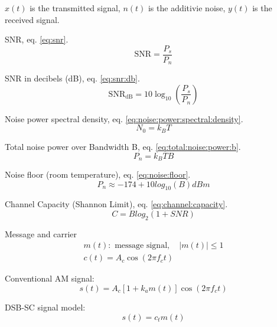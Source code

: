 $x(t)$ is the transmitted signal, $n(t)$ is the additivie noise, $y(t)$ is the received signal.

SNR, eq. \ref{eq:snr}.
\begin{equation}
  \label{eq:snr}
  \text{SNR} = \frac{P_s}{P_n}
\end{equation}

SNR in decibels (dB), eq. \ref{eq:snr:db}.
\begin{equation}
  \label{eq:snr:db}
  \text{SNR}_{\text{dB}} = 10 \log_{10}\left( \frac{P_s}{P_n} \right)
\end{equation}

Noise power spectral density, eq. \ref{eq:noise:power:spectral:density}.
\begin{equation}
  \label{eq:noise:power:spectral:density}
  N_0 = k_B T
\end{equation}

Total noise power over Bandwidth B, eq. \ref{eq:total:noise:power:b}.
\begin{equation}
  \label{eq:total:noise:power:b}
  P_n = k_B TB
\end{equation}

Noise floor (room temperature), eq. \ref{eq:noise:floor}.
\begin{equation}
  \label{eq:noise:floor}
  P_n \approx -174 + 10log_{10}(B) dBm
\end{equation}

Channel Capacity (Shannon Limit), eq. \ref{eq:channel:capacity}.
\begin{equation}
  \label{eq:channel:capacity}
  C = B log_2(1 + SNR)
\end{equation}

Message and carrier
\begin{equation}
  \label{eq:message}
  \begin{split}
  m(t): \text{ message signal}, \quad |m(t)| \leq 1\\
  c(t) = A_c \cos(2\pi f_c t)
  \end{split}
\end{equation}

Conventional AM signal:
\begin{equation}
  \label{eq:conv:am:signal}
  s(t) = A_c \left[1 + k_a m(t)\right] \cos(2\pi f_c t)
\end{equation}

DSB-SC signal model:
\begin{equation}
  \label{eq:dsb:sc}
  s(t) = c_t m(t)
\end{equation}

